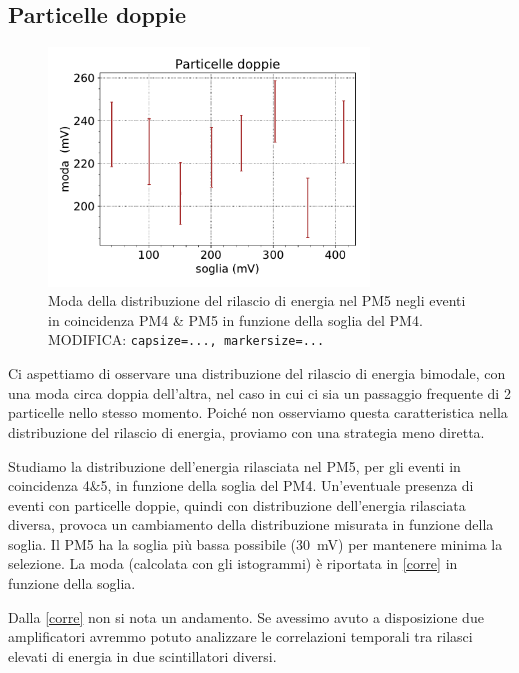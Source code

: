 \subsection{Particelle doppie}

\begin{figure}
	\centering
	\includegraphics[width=23em]{doppie}
	\caption{Moda della distribuzione del rilascio di energia nel PM5
	negli eventi in coincidenza PM4 \& PM5
	in funzione della soglia del PM4.
	MODIFICA: \texttt{capsize=..., markersize=...}}
	\label{corre}
\end{figure}

Ci aspettiamo di osservare una distribuzione del rilascio di energia bimodale,
con una moda circa doppia dell'altra,
nel caso in cui ci sia un passaggio frequente di 2 particelle nello stesso momento.
Poiché non osserviamo questa caratteristica nella distribuzione del rilascio di energia,
proviamo con una strategia meno diretta.

Studiamo la distribuzione dell'energia rilasciata nel PM5,
per gli eventi in coincidenza 4\&5,
in funzione della soglia del PM4.
Un'eventuale presenza di eventi con particelle doppie,
quindi con distribuzione dell'energia rilasciata diversa,
provoca un cambiamento della distribuzione misurata in funzione della soglia.
Il PM5 ha la soglia più bassa possibile (\SI{30}{mV}) per mantenere minima la selezione.
La moda (calcolata con gli istogrammi) è riportata in \autoref{corre} in funzione della soglia.

Dalla \autoref{corre} non si nota un andamento.
Se avessimo avuto a disposizione due amplificatori
avremmo potuto analizzare le correlazioni temporali tra rilasci elevati di energia in due scintillatori diversi.
